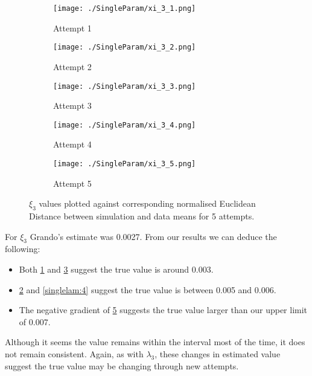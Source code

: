 \begin{figure}
    \begin{subfigure}{.3\textwidth}
      \centering
      \texttt{[image: ./SingleParam/xi\_3\_1.png]}
      \caption{Attempt 1}
      \label{singlexi:1}
    \end{subfigure}
    \begin{subfigure}{.3\textwidth}
      \centering
      \texttt{[image: ./SingleParam/xi\_3\_2.png]}
      \caption{Attempt 2}
      \label{singlexi:2}
    \end{subfigure}
    \begin{subfigure}{.3\textwidth}
        \centering
        \texttt{[image: ./SingleParam/xi\_3\_3.png]}
        \caption{Attempt 3}
        \label{singlexi:3}
    \end{subfigure}
    
    \centering
    \begin{subfigure}{.3\textwidth} 
        \centering
        \texttt{[image: ./SingleParam/xi\_3\_4.png]}
        \caption{Attempt 4}
        \label{singlexi:4}
    \end{subfigure}
    \begin{subfigure}{.3\textwidth}
        \centering
        \texttt{[image: ./SingleParam/xi\_3\_5.png]}
        \caption{Attempt 5}
        \label{singlexi:5}
    \end{subfigure}

    \caption{$\xi_3$ values plotted against corresponding normalised Euclidean Distance between simulation and data means for 5 attempts.}
    \label{singlexi}
\end{figure}


For $\xi_3$ Grando's estimate was 0.0027. From our results we can deduce the following:
\begin{itemize}
    \item Both \ref{singlexi:1} and \ref{singlexi:3} suggest the true value is around 0.003. 
    \item \ref{singlexi:2} and \ref{singlelam:4} suggest the true value is between 0.005 and 0.006.
    \item The negative gradient of \ref{singlexi:5} suggests the true value larger than our upper limit of 0.007.
\end{itemize}
Although it seems the value remains within the interval most of the time, it does not remain consistent. Again, as with $\lambda_3$, these changes in estimated value suggest the true value may be changing through new attempts.







